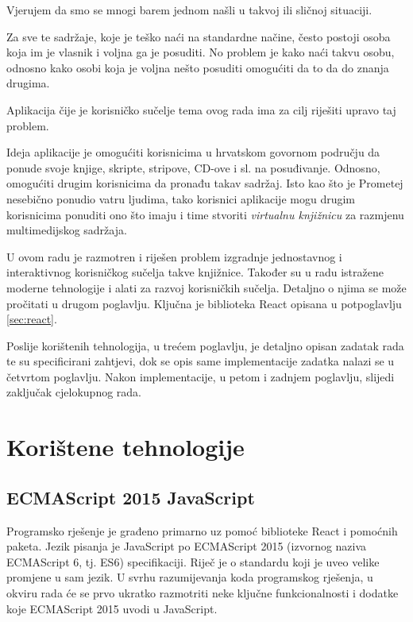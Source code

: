 \documentclass[times, utf8, zavrsni, numeric]{fer}
\newcommand{\razmakp}{\vspace{18pt}}
\newcommand{\razmaks}{\vspace{10pt}}
\begin{document}
Vjerujem da smo se mnogi barem jednom našli u takvoj ili sličnoj situaciji.

\razmakp

Za sve te sadržaje, koje je teško naći na standardne načine, često postoji osoba koja im je vlasnik i voljna ga je posuditi.
No problem je kako naći takvu osobu, odnosno kako osobi koja je voljna nešto posuditi omogućiti da to da do znanja drugima.
\razmaks

Aplikacija čije je korisničko sučelje tema ovog rada ima za cilj riješiti upravo taj problem.

\razmakp

Ideja aplikacije je omogućiti korisnicima u hrvatskom govornom području da ponude svoje knjige, skripte, stripove, CD-ove i sl. na posuđivanje.
Odnosno, omogućiti drugim korisnicima da pronađu takav sadržaj.
Isto kao što je Prometej nesebično ponudio vatru ljudima, tako korisnici aplikacije mogu drugim korisnicima ponuditi ono što imaju i time stvoriti \emph{virtualnu knjižnicu} za razmjenu multimedijskog sadržaja.

\razmakp

U ovom radu je razmotren i riješen problem izgradnje jednostavnog i interaktivnog korisničkog sučelja takve knjižnice.
Također su u radu istražene moderne tehnologije i alati za razvoj korisničkih sučelja.
Detaljno o njima se može pročitati u drugom poglavlju.
Ključna je biblioteka React opisana u potpoglavlju \ref{sec:react}.

Poslije korištenih tehnologija, u trećem poglavlju, je detaljno opisan zadatak rada te su specificirani zahtjevi, dok se opis same implementacije zadatka nalazi se u četvrtom poglavlju.
Nakon implementacije, u petom i zadnjem poglavlju, slijedi zaključak cjelokupnog rada.



\chapter{Korištene tehnologije}



\section{ECMAScript 2015 JavaScript}

Programsko rješenje je građeno primarno uz pomoć biblioteke React i pomoćnih paketa.
Jezik pisanja je JavaScript po ECMAScript 2015 (izvornog naziva ECMAScript 6, tj. ES6) specifikaciji.
Riječ je o standardu koji je uveo velike promjene u sam jezik.
U svrhu razumijevanja koda programskog rješenja, u okviru rada će se prvo ukratko razmotriti neke ključne funkcionalnosti i dodatke koje ECMAScript 2015 uvodi u JavaScript.
\end{document}

